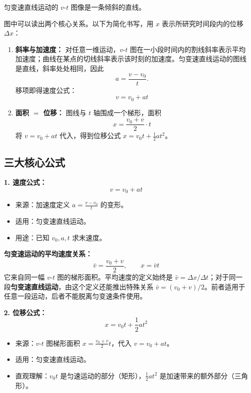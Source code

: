 匀变速直线运动的 $v$-$t$ 图像是一条倾斜的直线。

\begin{center}


\label{fig:vt-graph}
\end{center}

图中可以读出两个核心关系。以下为简化书写，用 $x$ 表示所研究时间段内的位移 $\Delta x$：

\begin{enumerate}
  \item \textbf{斜率与加速度：} 对任意一维运动，$v$-$t$ 图在一小段时间内的割线斜率表示平均加速度；曲线在某点的切线斜率表示该时刻的加速度。匀变速直线运动的图线是直线，斜率处处相同，因此
  \[
  a = \frac{v-v_0}{t}.
  \]
  移项即得速度公式：
  \[
  v = v_0 + at
  \]
  \item \textbf{面积 $=$ 位移：} 图线与 $t$ 轴围成一个梯形，面积
  \[
  x = \frac{v_0 + v}{2} \cdot t
  \]
  将 $v = v_0 + at$ 代入，得到位移公式 $x = v_0 t + \frac12 a t^2$。
\end{enumerate}

\subsection*{三大核心公式}

\textbf{1. 速度公式：}
\[
\boxed{v = v_0 + at}
\]
\begin{itemize}
  \item 来源：加速度定义 $a = \frac{v-v_0}{t}$ 的变形。
  \item 适用：匀变速直线运动。
  \item 用途：已知 $v_0, a, t$ 求末速度。
\end{itemize}

\textbf{匀变速运动的平均速度关系：}
\[
\boxed{\bar v=\frac{v_0+v}{2}},\qquad x=\bar v t
\]
它来自同一幅 $v$-$t$ 图的梯形面积。平均速度的定义始终是 $\bar v=\Delta x/\Delta t$；对于同一段\textbf{匀变速直线运动}，由这个定义还能推出特殊关系 $\bar v=(v_0+v)/2$。前者适用于任意一段运动，后者不能脱离匀变速条件使用。

\textbf{2. 位移公式：}
\[
\boxed{x = v_0 t + \frac12 a t^2}
\]
\begin{itemize}
  \item 来源：$v$-$t$ 图梯形面积 $x = \frac{v_0+v}{2}t$，代入 $v = v_0+at$。
  \item 适用：匀变速直线运动。
  \item 直观理解：$v_0 t$ 是匀速运动的部分（矩形），$\frac12 a t^2$ 是加速带来的额外部分（三角形）。
\end{itemize}

